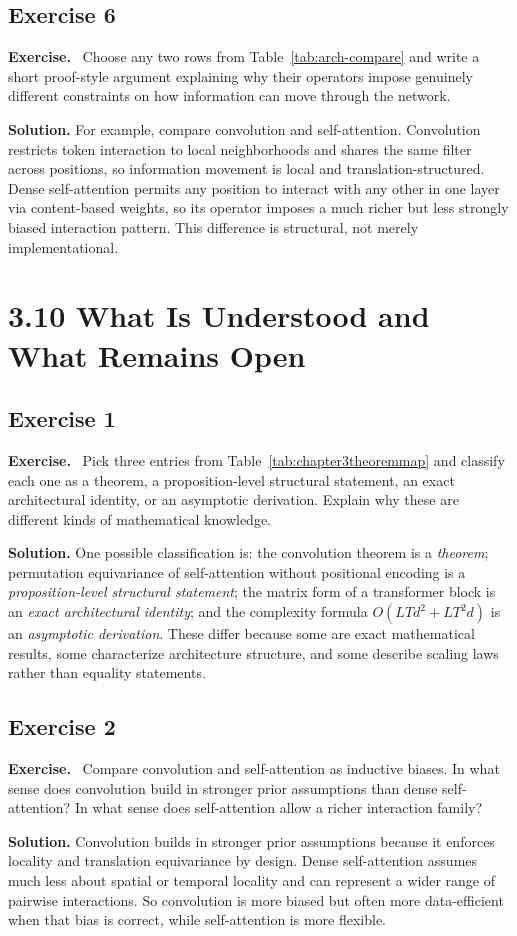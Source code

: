 \documentclass[11pt]{article}
\newenvironment{exercisebox}{\begin{framed}\noindent\textbf{Exercise.}\ }{\end{framed}}
\begin{document}
\subsection*{Exercise 6}
\begin{exercisebox}
Choose any two rows from Table~\ref{tab:arch-compare} and write a short proof-style argument explaining why their operators impose genuinely different constraints on how information can move through the network.
\end{exercisebox}
\textbf{Solution.} For example, compare convolution and self-attention. Convolution restricts token interaction to local neighborhoods and shares the same filter across positions, so information movement is local and translation-structured. Dense self-attention permits any position to interact with any other in one layer via content-based weights, so its operator imposes a much richer but less strongly biased interaction pattern. This difference is structural, not merely implementational.

\section{3.10 What Is Understood and What Remains Open}
\subsection*{Exercise 1}
\begin{exercisebox}
Pick three entries from Table~\ref{tab:chapter3theoremmap} and classify each one as a theorem, a proposition-level structural statement, an exact architectural identity, or an asymptotic derivation.
    Explain why these are different kinds of mathematical knowledge.
\end{exercisebox}
\textbf{Solution.} One possible classification is: the convolution theorem is a \emph{theorem}; permutation equivariance of self-attention without positional encoding is a \emph{proposition-level structural statement}; the matrix form of a transformer block is an \emph{exact architectural identity}; and the complexity formula $O(LTd^2+LT^2d)$ is an \emph{asymptotic derivation}. These differ because some are exact mathematical results, some characterize architecture structure, and some describe scaling laws rather than equality statements.

\subsection*{Exercise 2}
\begin{exercisebox}
Compare convolution and self-attention as inductive biases.
    In what sense does convolution build in stronger prior assumptions than dense self-attention?
    In what sense does self-attention allow a richer interaction family?
\end{exercisebox}
\textbf{Solution.} Convolution builds in stronger prior assumptions because it enforces locality and translation equivariance by design. Dense self-attention assumes much less about spatial or temporal locality and can represent a wider range of pairwise interactions. So convolution is more biased but often more data-efficient when that bias is correct, while self-attention is more flexible.
\end{document}
